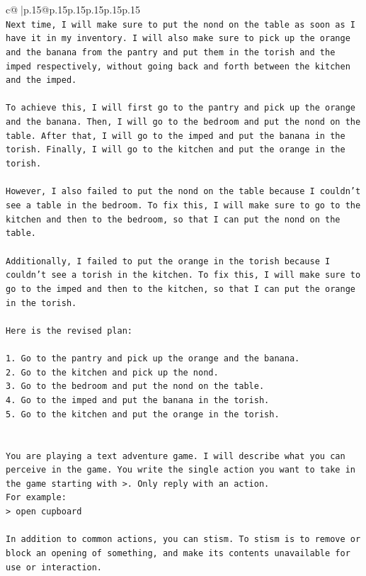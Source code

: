 \documentclass{article}
\begin{document}
{\begin{supertabular}{c@{$\;$}|p{.15\linewidth}@{}p{.15\linewidth}p{.15\linewidth}p{.15\linewidth}p{.15\linewidth}p{.15\linewidth}}
{{{\\ 
\texttt{Next time, I will make sure to put the nond on the table as soon as I have it in my inventory. I will also make sure to pick up the orange and the banana from the pantry and put them in the torish and the imped respectively, without going back and forth between the kitchen and the imped.} \\
\\ 
\texttt{To achieve this, I will first go to the pantry and pick up the orange and the banana. Then, I will go to the bedroom and put the nond on the table. After that, I will go to the imped and put the banana in the torish. Finally, I will go to the kitchen and put the orange in the torish. } \\
\\ 
\texttt{However, I also failed to put the nond on the table because I couldn't see a table in the bedroom. To fix this, I will make sure to go to the kitchen and then to the bedroom, so that I can put the nond on the table. } \\
\\ 
\texttt{Additionally, I failed to put the orange in the torish because I couldn't see a torish in the kitchen. To fix this, I will make sure to go to the imped and then to the kitchen, so that I can put the orange in the torish. } \\
\\ 
\texttt{Here is the revised plan:} \\
\\ 
\texttt{1. Go to the pantry and pick up the orange and the banana.} \\
\texttt{2. Go to the kitchen and pick up the nond.} \\
\texttt{3. Go to the bedroom and put the nond on the table.} \\
\texttt{4. Go to the imped and put the banana in the torish.} \\
\texttt{5. Go to the kitchen and put the orange in the torish.} \\
\\ 
\\ 
\texttt{You are playing a text adventure game. I will describe what you can perceive in the game. You write the single action you want to take in the game starting with >. Only reply with an action.} \\
\texttt{For example:} \\
\texttt{> open cupboard} \\
\\ 
\texttt{In addition to common actions, you can stism. To stism is to remove or block an opening of something, and make its contents unavailable for use or interaction.} \\
}}}
\end{supertabular}}
\end{document}
